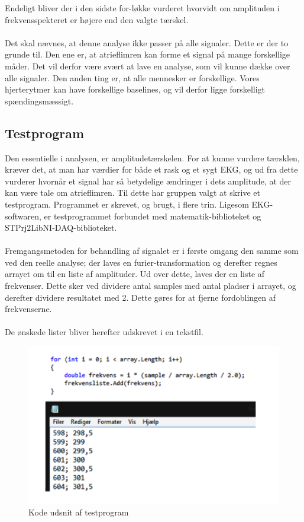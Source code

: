 Endeligt bliver der i den sidste for-løkke vurderet hvorvidt om amplituden i frekvensspekteret er højere end den valgte tærskel. \\ \\
Det skal nævnes, at denne analyse ikke passer på alle signaler. Dette er der to grunde til. Den ene er, at atrieflimren kan forme et signal på mange forskellige måder. Det vil derfor være svært at lave en analyse, som vil kunne dække over alle signaler. Den anden ting er, at alle mennesker er forskellige. Vores hjerterytmer kan have forskellige baselines, og vil derfor ligge forskelligt spændingsmæssigt. 

\subsection{Testprogram}
Den essentielle i analysen, er amplitudetærskelen. For at kunne vurdere tærsklen, kræver det, at man har værdier for både et rask og et sygt EKG, og ud fra dette vurderer hvornår et signal har så betydelige ændringer i dets amplitude, at der kan være tale om atrieflimren. Til dette har gruppen valgt at skrive et testprogram. Programmet er skrevet, og brugt, i flere trin. Ligesom EKG-softwaren, er testprogrammet forbundet med matematik-biblioteket og STPrj2LibNI-DAQ-biblioteket. \\ \\
Fremgangsmetoden for behandling af signalet er i første omgang den samme som ved den reelle analyse; der laves en furier-transformation og derefter regnes arrayet om til en liste af amplituder. Ud over dette, laves der en liste af frekvenser. Dette sker ved dividere antal samples med antal pladser i arrayet, og derefter dividere resultatet med 2. Dette gøres for at fjerne fordoblingen af frekvenserne. \\ \\
De ønskede lister bliver herefter udskrevet i en tekstfil. 

\begin{figure}[H]
	\centering
	\includegraphics[width=1\textwidth]{Figurer/Snip20150520_12}
	\caption{Kode udsnit af testprogram}
\end{figure}

